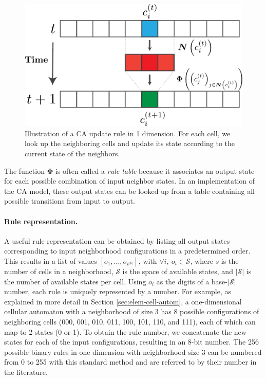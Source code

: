 \begin{figure}[htbp]
  \centering
 \includegraphics[width=.7\linewidth]{figures/ca_base}
  \caption{Illustration of a \acl{CA} update rule in 1 dimension. For each cell,
  we look up the neighboring cells and update its state according to the current
state of the neighbors.}
  \label{fig:ca_base}
\end{figure}

The function $\boldsymbol{\Phi}$ is often called a \emph{rule table} because it
associates an output state for each possible combination of input neighbor
states. In an implementation of the \ac{CA} model, these output states can be
looked up from a table containing all possible transitions from input to output.

\paragraph{Rule representation.}
A useful rule representation can be obtained by listing all output states
corresponding to input neighborhood configurations in a predetermined order. This 
results in a list of values $[o_1, \ldots, o_{s^{|\mathcal{S}|}}]$, with 
$\forall i,\ o_{i} \in \mathcal{S}$, where $s$ is
the number of cells in a neighborhood, $\mathcal{S}$ is the space of available states, and
$|\mathcal{S}|$ is the number of available states per cell. Using $o_{i}$ as the
digits of a base-$|\mathcal{S}|$ number, each rule is uniquely represented by a number.
For example, as explained in more detail in Section \ref{sec:elem-cell-autom},
a one-dimensional cellular automaton with a neighborhood of size 3 has 8 possible configurations of neighboring cells (000, 001, 010, 011, 100, 101, 110, and 111), each of which can map to 2 states (0 or 1). To obtain the rule number, we concatenate the new states for each of the input configurations, resulting in an 8-bit number. 
The 256 possible binary rules in one dimension with neighborhood size 3 can be numbered
from 0 to 255 with this standard method and are referred to by their number in the literature.

